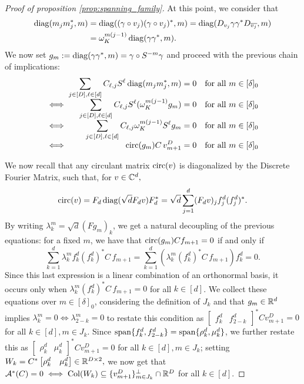 \begin{proof}[Proof of proposition \ref{prop:spanning_family}]
  At this point, we consider that \begin{align} \operatorname{diag}(m_j m_j^*, m) &= \operatorname{diag}((\gamma \circ v_j) (\gamma \circ v_j)^*, m) = \operatorname{diag}(D_{v_j} \gamma \gamma^* D_{\overline{v_j}}, m) \\ &= \omega_K^{m(j - 1)} \operatorname{diag}(\gamma \gamma^*, m). \label{eq:gam_diag}\end{align}  We now set $g_m := \operatorname{diag}(\gamma \gamma^*, m) = \gamma \circ S^{-m} \gamma$ and proceed with the previous chain of implications:
  \[\arraycolsep=1.4pt%
  \begin{array}{c>{\displaystyle}rcl@{\quad}r}
    & \sum_{j \in [D], \ell \in [d]} C_{\ell, j} S^{\ell} \diag(m_j m_j^*, m) & = & 0 & \text{for all} \ m \in [\delta]_0 \\
    \iff & \sum_{j \in [D], \ell \in [d]} C_{\ell, j} S^{\ell} (\omega_K^{m(j - 1)} g_m) & = & 0 & \text{for all} \ m \in [\delta]_0 \\
    \iff & \sum_{j \in [D], \ell \in [d]} C_{\ell, j} \omega_K^{m(j - 1)} S^{\ell} g_m & = & 0 & \text{for all} \ m \in [\delta]_0 \\
    \iff & \circop(g_m) C \, v^D_{m+1} & = & 0 & \text{for all} \ m \in [\delta]_0 \\
  \end{array}\]

  We now recall that any circulant matrix $\operatorname{circ}(v)$ is diagonalized by the Discrete Fourier Matrix, such that, for $v \in \mathbb{C}^d,$ \begin{equation} \operatorname{circ}(v) = F_d \operatorname{diag}(\sqrt{d} F_d v) F_d^* = \sqrt{d} \sum_{j = 1}^d (F_d v)_j f_j^d (f_j^d)^*. \label{eq:circ_dft_diag} \end{equation}  By writing $\lambda_k^m = \sqrt{d}(F g_m)_k$, we get a natural decoupling of the previous equations: for a fixed $m$, we have that $\operatorname{circ}(g_m) C f_{m + 1} = 0$ if and only if \[\sum_{k = 1}^d \lambda_k^m f_k^d (f_k^d)^* C \, f_{m + 1} = \sum_{k = 1}^d (\lambda_k^m (f_k^d)^* C \, f_{m + 1}) f_k^d = 0.\]  Since this last expression is a linear combination of an orthonormal basis, it occurs only when $\lambda_k^m (f_k^d)^* C \, f_{m + 1} = 0$ for all $k \in [d]$.  We collect these equations over $m \in [\delta]_0$, considering the definition of $J_k$ and that $g_m \in \mathbb{R}^d$ implies $\lambda_k^m = 0 \iff \lambda_{2 - k}^m = 0$ to restate this condition as $\begin{bmatrix} f_k^d & f_{2 - k}^d \end{bmatrix}^* C v^D_{m + 1} = 0$ for all $k \in [d], m \in J_k$.  Since $\operatorname{span}\{f_k^d, f_{2 - k}^d\} = \operatorname{span}\{\rho_k^d, \mu_k^d\}$, we further restate this as $\begin{bmatrix} \rho_k^d & \mu_k^d \end{bmatrix}^* C v_{m + 1}^D = 0$ for all $k \in [d], m \in J_k$; setting $W_k = C^* \begin{bmatrix} \rho_k^d & \mu_k^d \end{bmatrix} \in \mathbb{R}^{D \times 2},$ we now get that $\mathcal{A}^*(C) = 0 \iff \operatorname{Col}(W_k) \subseteq \{v_{m + 1}^D\}_{m \in J_k}^\perp \cap \mathbb{R}^D$ for all $k \in [d]$.


\end{proof}

